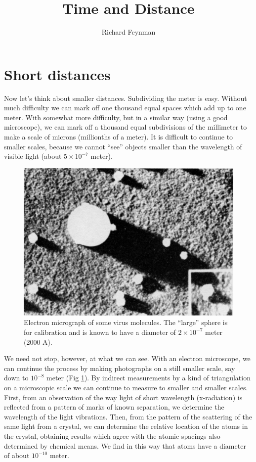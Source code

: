 \documentclass{article}
\title{Time and Distance}
\author{Richard Feynman}
\begin{document}
	\maketitle

	\section{Short distances}

	Now let’s think about smaller distances. Subdividing the meter is easy. Without much difficulty we can mark off one thousand equal spaces which add up to one meter. With somewhat more difficulty, but in a similar way (using a good microscope), we can mark off a thousand equal subdivisions of the millimeter to make a scale of microns (millionths of a meter). It is difficult to continue to smaller scales, because we cannot “see” objects smaller than the wavelength of visible light (about $5 \times 10^{-7}$ meter).\\

	\begin{figure}[h]
	\centering
		\includegraphics[scale=2.0]{img1.png}
		\caption{Electron micrograph of some virus molecules. The “large” sphere is for calibration and is known to have a diameter of $2 \times 10^{-7}$ meter (2000 A).}
		\label{Fi: Img59}
	\end{figure}

	We need not stop, however, at what we can see. With an electron microscope, we can continue the process by making photographs on a still smaller scale, say down to $10^{-8}$ meter (Fig \ref{Fi: Img59}). By indirect measurements by a kind of triangulation on a microscopic scale we can continue to measure to smaller and smaller scales. First, from an observation of the way light of short wavelength (x-radiation) is reflected from a pattern of marks of known separation, we determine the wavelength of the light vibrations. Then, from the pattern of the scattering of the same light from a crystal, we can determine the relative location of the atoms in the crystal, obtaining results which agree with the atomic spacings also determined by chemical means. We find in this way that atoms have a diameter of about $10^{-10}$ meter.\\ 
\end{document}
